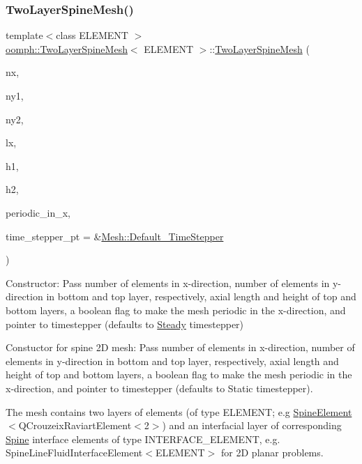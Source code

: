 \subsubsection{\texorpdfstring{Two\+Layer\+Spine\+Mesh()}{TwoLayerSpineMesh()}\hspace{0.1cm}{\footnotesize\ttfamily [2/3]}}
{\footnotesize\ttfamily template$<$class E\+L\+E\+M\+E\+NT $>$ \\
\hyperlink{classoomph_1_1TwoLayerSpineMesh}{oomph\+::\+Two\+Layer\+Spine\+Mesh}$<$ E\+L\+E\+M\+E\+NT $>$\+::\hyperlink{classoomph_1_1TwoLayerSpineMesh}{Two\+Layer\+Spine\+Mesh} (\begin{DoxyParamCaption}\item[{const unsigned \&}]{nx,  }\item[{const unsigned \&}]{ny1,  }\item[{const unsigned \&}]{ny2,  }\item[{const double \&}]{lx,  }\item[{const double \&}]{h1,  }\item[{const double \&}]{h2,  }\item[{const bool \&}]{periodic\+\_\+in\+\_\+x,  }\item[{\hyperlink{classoomph_1_1TimeStepper}{Time\+Stepper} $\ast$}]{time\+\_\+stepper\+\_\+pt = {\ttfamily \&\hyperlink{classoomph_1_1Mesh_a12243d0fee2b1fcee729ee5a4777ea10}{Mesh\+::\+Default\+\_\+\+Time\+Stepper}} }\end{DoxyParamCaption})}



Constructor\+: Pass number of elements in x-\/direction, number of elements in y-\/direction in bottom and top layer, respectively, axial length and height of top and bottom layers, a boolean flag to make the mesh periodic in the x-\/direction, and pointer to timestepper (defaults to \hyperlink{classoomph_1_1Steady}{Steady} timestepper) 

Constuctor for spine 2D mesh\+: Pass number of elements in x-\/direction, number of elements in y-\/direction in bottom and top layer, respectively, axial length and height of top and bottom layers, a boolean flag to make the mesh periodic in the x-\/direction, and pointer to timestepper (defaults to Static timestepper).

The mesh contains two layers of elements (of type E\+L\+E\+M\+E\+NT; e.\+g \hyperlink{classoomph_1_1SpineElement}{Spine\+Element}$<$Q\+Crouzeix\+Raviart\+Element$<$2$>$) and an interfacial layer of corresponding \hyperlink{classoomph_1_1Spine}{Spine} interface elements of type I\+N\+T\+E\+R\+F\+A\+C\+E\+\_\+\+E\+L\+E\+M\+E\+NT, e.\+g. Spine\+Line\+Fluid\+Interface\+Element$<$\+E\+L\+E\+M\+E\+N\+T$>$ for 2D planar problems. 

